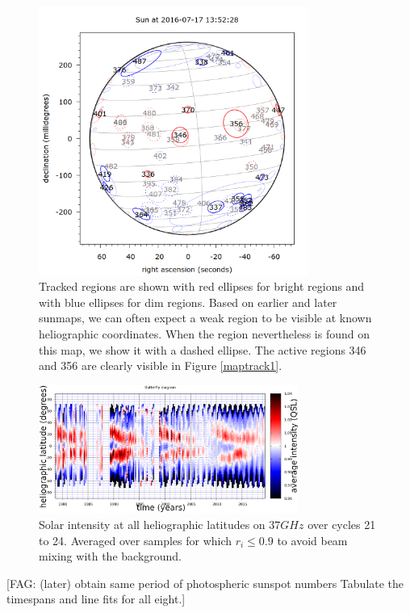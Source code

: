 \documentclass{aa}
\newcommand{\fag}[1]{\textcolor{midpurple}{[FAG: #1]}} %
\begin{document}
\begin{figure} \centering \includegraphics[width=8.8cm]{maptrack2.png} \caption{Tracked regions are shown with red 
ellipses for bright regions and with blue ellipses for dim regions. Based on earlier and later sunmaps, we can often 
expect a weak region to be visible at known heliographic coordinates. When the region nevertheless is found on this map, 
we show it with a dashed ellipse. The active regions 346 and 356 are clearly visible in Figure \ref{maptrack1}.} 
\label{maptrack2} \end{figure}




\begin{figure}
\centering
\includegraphics[width=8.5cm]{butterfly_clear_raw.png}
\caption{Solar intensity at all heliographic latitudes on $\si{37}{GHz}$ over cycles 21 to 24. Averaged over samples for which $r_i \le 0.9$ to avoid beam mixing with the background.
}
\label{butterfly_clear_raw}
\end{figure}
\fag{(later) obtain same period of photospheric sunspot numbers
Tabulate the timespans and line fits for all eight.}\\
\end{document}
